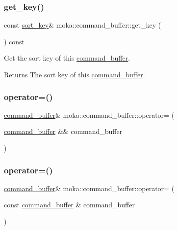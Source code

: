 \subsubsection{\texorpdfstring{get\_key()}{get\_key()}}
{\footnotesize\ttfamily const \mbox{\hyperlink{namespacemoka_afa30a616e67b83113ebdb857555cf2bb}{sort\+\_\+key}}\& moka\+::command\+\_\+buffer\+::get\+\_\+key (\begin{DoxyParamCaption}{ }\end{DoxyParamCaption}) const}



Get the sort key of this \mbox{\hyperlink{classmoka_1_1command__buffer}{command\+\_\+buffer}}. 

\begin{DoxyReturn}{Returns}
The sort key of this \mbox{\hyperlink{classmoka_1_1command__buffer}{command\+\_\+buffer}}. 
\end{DoxyReturn}
\mbox{\label{classmoka_1_1command__buffer_af9b91d8223cd261be50f18fcd6b31efa}} 
\subsubsection{\texorpdfstring{operator=()}{operator=()}\hspace{0.1cm}{\footnotesize\ttfamily [1/2]}}
{\footnotesize\ttfamily \mbox{\hyperlink{classmoka_1_1command__buffer}{command\+\_\+buffer}}\& moka\+::command\+\_\+buffer\+::operator= (\begin{DoxyParamCaption}\item[{\mbox{\hyperlink{classmoka_1_1command__buffer}{command\+\_\+buffer}} \&\&}]{command\+\_\+buffer }\end{DoxyParamCaption})\hspace{0.3cm}{\ttfamily [noexcept]}}

\mbox{\label{classmoka_1_1command__buffer_a0f05e599238d1d0b184cb163cacf4e10}} 
\subsubsection{\texorpdfstring{operator=()}{operator=()}\hspace{0.1cm}{\footnotesize\ttfamily [2/2]}}
{\footnotesize\ttfamily \mbox{\hyperlink{classmoka_1_1command__buffer}{command\+\_\+buffer}}\& moka\+::command\+\_\+buffer\+::operator= (\begin{DoxyParamCaption}\item[{const \mbox{\hyperlink{classmoka_1_1command__buffer}{command\+\_\+buffer}} \&}]{command\+\_\+buffer }\end{DoxyParamCaption})\hspace{0.3cm}{\ttfamily [delete]}}

